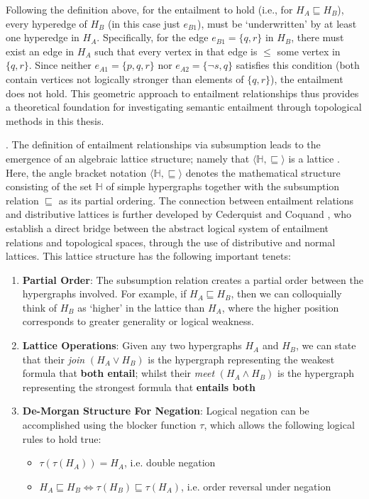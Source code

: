 \documentclass[12pt,twoside]{report}
\begin{document}
Following the definition above, for the entailment to hold (i.e., for $H_A \sqsubseteq H_B$), every hyperedge of $H_B$ (in this case just $e_{B1}$), must be `underwritten' by at least one hyperedge in $H_A$. Specifically, for the edge $e_{B1}=\{q,r\}$ in $H_B$, there must exist an edge in $H_A$ such that every vertex in that edge is $\leq$
some vertex in $\{q, r\}$. Since neither $e_{A1}= \{p,q,r\}$ nor $e_{A2}= \{¬s,q\}$ satisfies this condition (both contain vertices not logically stronger than elements of $\{q, r\}$), the entailment does not hold. This geometric approach to entailment relationships thus provides a theoretical foundation for investigating semantic entailment through topological methods in this thesis. \newline \par

. The definition of entailment relationships via subsumption leads to the emergence of an algebraic lattice structure; namely that $\langle\mathbb{H}, \sqsubseteq\rangle$ is a lattice \cite{leibnizianAnalysis}. Here, the angle bracket notation $\langle\mathbb{H}, \sqsubseteq\rangle$ denotes the mathematical structure consisting of the set $\mathbb{H}$ of simple hypergraphs together with the subsumption relation $\sqsubseteq$ as its partial ordering. The connection between entailment relations and distributive lattices is further developed by Cederquist and Coquand \cite{Cederquist}, who establish a direct bridge between the abstract logical system of entailment relations and topological spaces, through the use of distributive and normal lattices. This lattice structure has the following important tenets:
\begin{enumerate}[itemsep=0pt]
    \item \textbf{Partial Order}: The subsumption relation creates a partial order between the hypergraphs involved. For example, if $H_A \sqsubseteq H_B$, then we can colloquially think of $H_B$ as `higher' in the lattice than $H_A$, where the higher position corresponds to greater generality or logical weakness.
    \item \textbf{Lattice Operations}: Given any two hypergraphs $H_A$ and $H_B$, we can state that their \textit{join} $(H_A \lor H_B)$ is the hypergraph representing the weakest formula that \textbf{both entail}; whilst their \textit{meet} $(H_A \land H_B)$ is the hypergraph representing the strongest formula that \textbf{entails both}
    \item \textbf{De-Morgan Structure For Negation}: Logical negation can be accomplished using the blocker function $\tau$, which allows the following logical rules to hold true:
    \begin{itemize}[topsep=0pt]
        \item $\tau(\tau(H_A)) = H_A$, i.e. double negation
        \item $H_A \sqsubseteq H_B \iff \tau(H_B) \sqsubseteq \tau(H_A)$, i.e. order reversal under negation
    \end{itemize}
\end{enumerate}
\end{document}
